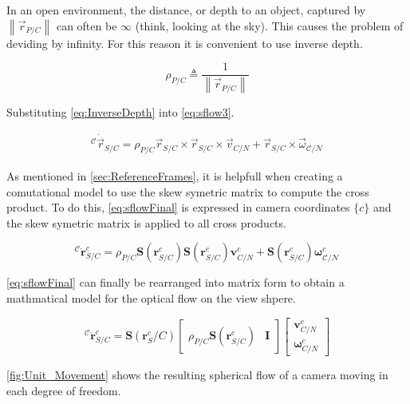 \documentclass{UoNMCHA}
\newcommand{\norm}[1]{\left\lVert#1\right\rVert}
\numberwithin{equation}{section}
\begin{document}
In an open environment, the distance, or depth to an object, captured by $\norm{\vec{r}_{P/C}}$ can often be $\infty$ (think, looking at the sky). This causes the problem of deviding by infinity. For this reason it is convenient to use inverse depth.

\begin{equation}\label{eq:InverseDepth}
	\rho_{P/C} \triangleq \frac{1}{\norm{\vec{r}_{P/C}}}
\end{equation}

Substituting \cref{eq:InverseDepth} into \cref{eq:sflow3}.

\begin{equation}\label{eq:sflow4}
	\begin{split}
		{}^\mathcal{C}\dot{\vec{r}}_{S/C} = \rho_{P/C}\vec{r}_{S/C}\times\vec{r}_{S/C}\times\vec{v}_{C/N} + \vec{r}_{S/C}\times\vec{\omega}_{\mathcal{C}/\mathcal{N}}
	\end{split}
\end{equation}

As mentioned in \cref{sec:ReferenceFrames}, it is helpfull when creating a comutational model to use the skew symetric matrix to compute the cross product. To do this, \cref{eq:sflowFinal} is expressed in camera coordinates $\{c\}$ and the skew symetric matrix is applied to all cross products.

\begin{equation}\label{eq:sflowFinal}
	{}^\mathcal{C}\dot{\mathbf{r}}^{c}_{S/C} = \rho_{P/C}\mathbf{S}(\mathbf{r}^{c}_{S/C}) \mathbf{S}(\mathbf{r}^{c}_{S/C}) \mathbf{v}^{c}_{C/N} + \mathbf{S}(\mathbf{r}^{c}_{S/C})\mathbf{\omega}^{c}_{\mathcal{C}/\mathcal{N}}
\end{equation}

\cref{eq:sflowFinal} can finally be rearranged into matrix form to obtain a mathmatical model for the optical flow on the view shpere.

\begin{equation}\label{eq:SphericalFlow}
	{}^\mathcal{C}\dot{\mathbf{r}}^{c}_{S/C} = \mathbf{S}(\mathbf{r}^{c}_S/C)
	\begin{bmatrix}
		\rho_{P/C} \mathbf{S}(\mathbf{r}^{c}_{S/C}) & \mathbf{I}
	\end{bmatrix}
	\begin{bmatrix}
		\mathbf{v}^{c}_{C/N}\\
		\mathbf{\omega}^{c}_{C/N}
	\end{bmatrix}
\end{equation}

\cref{fig:Unit_Movement} shows the resulting spherical flow of a camera moving in each degree of freedom.
\end{document}
